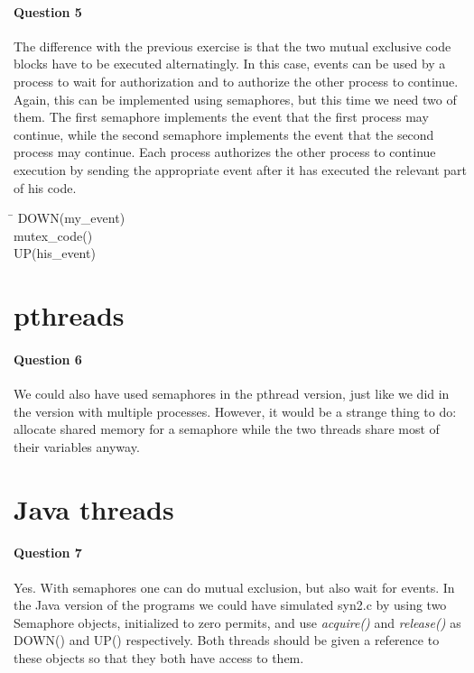 \documentclass[a4paper,10pt]{article}
\begin{document}
\paragraph{Question 5}
The difference with the previous exercise is that the two mutual exclusive code blocks have to be executed alternatingly. In this case, events can be used by a process to wait for authorization and to authorize the other process to continue. Again, this can be implemented using semaphores, but this time we need two of them. The first semaphore implements the event that the first process may continue, while the second semaphore implements the event that the second process may continue. Each process authorizes the other process to continue execution by sending the appropriate event after it has executed the relevant part of his code.
\begin{tabbing}
\hspace{20pt}\=\kill
 \> DOWN(my\_event)\\ 
 \> mutex\_code()\\ 
 \> UP(his\_event) 
\end{tabbing}

\section{pthreads}
\paragraph{Question 6}
We could also have used semaphores in the pthread version, just like we did in the version with multiple processes. However, it would be a strange thing to do: allocate shared memory for a semaphore while the two threads share most of their variables anyway.

\section{Java threads}
\paragraph{Question 7}
Yes. With semaphores one can do mutual exclusion, but also wait for events. In the Java version of the programs we could have simulated syn2.c by using two Semaphore objects, initialized to zero permits, and use \emph{acquire()} and \emph{release()} as DOWN() and UP() respectively. Both threads should be given a reference to these objects so that they both have access to them.
\end{document}
